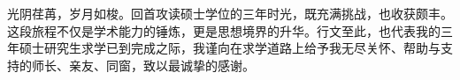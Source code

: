 

\begin{ack}

光阴荏苒，岁月如梭。回首攻读硕士学位的三年时光，既充满挑战，也收获颇丰。这段旅程不仅是学术能力的锤炼，更是思想境界的升华。行文至此，也代表我的三年硕士研究生求学已到完成之际，我谨向在求学道路上给予我无尽关怀、帮助与支持的师长、亲友、同窗，致以最诚挚的感谢。




\end{ack}
